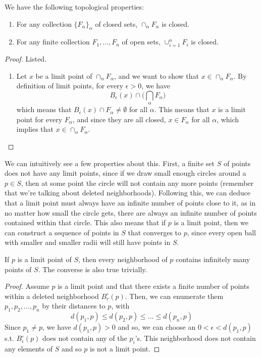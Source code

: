 \documentclass{article}
\begin{document}
    \begin{theorem}
    We have the following topological properties: 
    \begin{enumerate}
        \item For any collection $\{F_\alpha\}_\alpha$ of closed sets, $\cap_\alpha F_\alpha$ is closed. 
        \item For any finite collection $F_1, \ldots, F_n$ of open sets, $\cup_{i=1}^n F_i$ is closed. 
    \end{enumerate}
    \end{theorem}
    \begin{proof}
    Listed. 
    \begin{enumerate}
        \item Let $x$ be a limit point of $\cap_\alpha F_\alpha$, and we want to show that $x \in \cap_\alpha F_\alpha$. By definition of limit points, for every $\epsilon > 0$, we have 
        \[B_\epsilon (x) \cap \bigg( \bigcap_\alpha F_\alpha \bigg) \]
        which means that $B_\epsilon (x) \cap F_\alpha \neq \emptyset$ for all $\alpha$. This means that $x$ is a limit point for every $F_\alpha$, and since they are all closed, $x \in F_\alpha$ for all $\alpha$, which implies that $x \in \cap_\alpha F_\alpha$. 
    \end{enumerate}
    \end{proof}

    We can intuitively see a few properties about this. First, a finite set $S$ of points does not have any limit points, since if we draw small enough circles around a $p \in S$, then at some point the circle will not contain any more points (remember that we're talking about deleted neighborhoods). Following this, we can deduce that a limit point must always have an infinite number of points close to it, as in no matter how small the circle gets, there are always an infinite number of points contained within that circle. This also means that if $p$ is a limit point, then we can construct a sequence of points in $S$ that converges to $p$, since every open ball with smaller and smaller radii will still have points in $S$.

    \begin{theorem}
      If $p$ is a limit point of $S$, then every neighborhood of $p$ contains infinitely many points of $S$. The converse is also true trivially. 
    \end{theorem}
    \begin{proof}
      Assume $p$ is a limit point and that there exists a finite number of points within a deleted neighborhood $B_r^\circ (p)$. Then, we can enumerate them $p_1, p_2, \ldots, p_n$ by their distances to $p$, with 
      \begin{equation}
        d(p_1, p) \leq d(p_2, p) \leq \ldots \leq d(p_n, p)
      \end{equation}
      Since $p_1 \neq p$, we have $d(p_1, p) > 0$ and so, we can choose an $0 < \epsilon < d(p_1, p)$ s.t. $B_\epsilon^\circ (p)$ does not contain any of the $p_i$'s. This neighborhood does not contain any elements of $S$ and so $p$ is not a limit point. 
    \end{proof}
\end{document}
